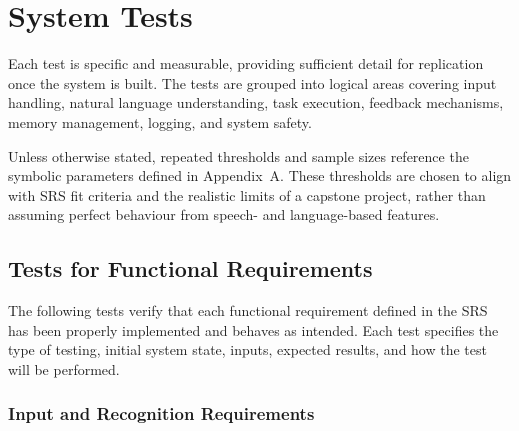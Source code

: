\documentclass[12pt, titlepage]{article}
\begin{document}
\section{System Tests}

Each test is specific and measurable, providing sufficient detail for
replication once the system is built. The tests are grouped into logical
areas covering input handling, natural language understanding, task
execution, feedback mechanisms, memory management, logging, and system
safety.

Unless otherwise stated, repeated thresholds and sample sizes reference the
symbolic parameters defined in Appendix~A. These thresholds are chosen to
align with SRS fit criteria and the realistic limits of a capstone project,
rather than assuming perfect behaviour from speech- and language-based
features.

\subsection{Tests for Functional Requirements}

The following tests verify that each functional requirement defined in the
SRS has been properly implemented and behaves as intended. Each test
specifies the type of testing, initial system state, inputs, expected
results, and how the test will be performed.

\subsubsection{Input and Recognition Requirements}
\end{document}
